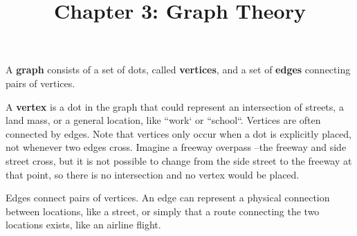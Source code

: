 \documentclass{beamer}
\title{Chapter 3: Graph Theory}
\date{}
\theoremstyle{definition}
\begin{document}
\maketitle



\begin{frame}

\begin{definition}
A \textbf{graph} consists of a set of dots, called \textbf{vertices}, and a set of \textbf{edges} connecting pairs of vertices.  
\end{definition}

\begin{definition}[Vertex]
A \textbf{vertex} is a dot in the graph that 
could represent an intersection of streets, a land 
mass, or a general location, like ``work` or ``school``.  Vertices are often connected by edges.  Note that vertices only occur when a dot is explicitly placed, not whenever two edges cross.  Imagine a freeway overpass --the freeway and side street cross, but it is not possible to change from the side street to the freeway at that point, so there is no intersection and no vertex would be placed.
\end{definition}

\begin{definition}[Edges]
Edges connect pairs of vertices.  An edge can represent a physical connection between 
locations, like a street, or simply that a route connecting the two locations exists, like 
an airline flight.
\end{definition}
\end{frame}



\end{document}
